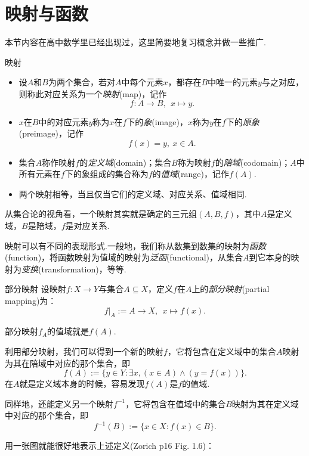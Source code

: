 \section{映射与函数}

本节内容在高中数学里已经出现过，这里简要地复习概念并做一些推广.

\begin{definition}{映射}
	\begin{itemize}
		\item 设$A$和$B$为两个集合，若对$A$中每个元素$x$，都存在$B$中唯一的元素$y$与之对应，则称此对应关系为一个\textit{映射}(map)，记作$$f:A \to B,~~x \mapsto y.$$
		\item $x$在$B$中的对应元素$y$称为$x$在$f$下的\textit{象}(image)，$x$称为$y$在$f$下的\textit{原象}(preimage)，记作$$f(x) = y,~ x \in A.$$
		\item 集合$A$称作映射$f$的\textit{定义域}(domain)；集合$B$称为映射$f$的\textit{陪域}(codomain)；$A$中所有元素在$f$下的象组成的集合称为$f$的\textit{值域}(range)，记作$f(A)$.
		\item 两个映射相等，当且仅当它们的定义域、对应关系、值域相同.
	\end{itemize}
\end{definition}

从集合论的视角看，一个映射其实就是确定的三元组$(A,B,f)$，其中$A$是定义域，$B$是陪域，$f$是对应关系.

映射可以有不同的表现形式.一般地，我们称从数集到数集的映射为\textit{函数}(function)，将函数映射为值域的映射为\textit{泛函}(functional)，从集合$A$到它本身的映射为\textit{变换}(transformation)，等等.

\begin{definition}{部分映射}
	设映射$f:X \to Y$与集合$A \subseteq X$，定义$f$在$A$上的\textit{部分映射}(partial mapping)为：$$f|_A := A \to X,~~x \mapsto f(x).$$
\end{definition}
\begin{remark}
	部分映射$f_A$的值域就是$f(A)$.
\end{remark}

利用部分映射，我们可以得到一个新的映射$f$，它将包含在定义域中的集合$A$映射为其在陪域中对应的那个集合，即$$f(A) := \{ y \in Y:\exists x, (x \in A) \wedge (y=f(x)) \}.$$
在$A$就是定义域本身的时候，容易发现$f(A)$是$f$的值域.

同样地，还能定义另一个映射$f^{-1}$，它将包含在值域中的集合$B$映射为其在定义域中对应的那个集合，即$$f^{-1}(B) := \{ x \in X:f(x) \in B \}.$$

用一张图就能很好地表示上述定义(Zorich p16 Fig. 1.6)：

